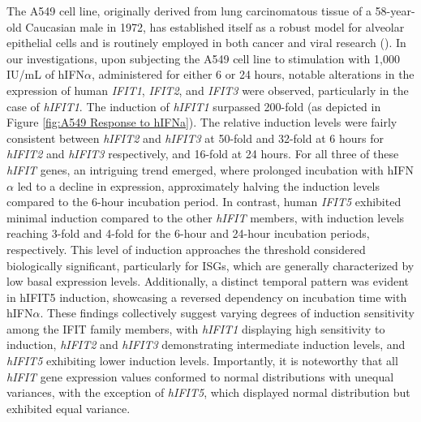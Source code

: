 The A549 cell line, originally derived from lung carcinomatous tissue of a 58-year-old Caucasian male in 1972, has established itself as a robust model for alveolar epithelial cells and is routinely employed in both cancer and viral research (\cite{Lieber1976ACells}). In our investigations, upon subjecting the A549 cell line to stimulation with 1,000 IU/mL of hIFN\(\alpha\), administered for either 6 or 24 hours, notable alterations in the expression of human \textit{IFIT1}, \textit{IFIT2}, and \textit{IFIT3} were observed, particularly in the case of \textit{hIFIT1}. The induction of \textit{hIFIT1} surpassed 200-fold (as depicted in Figure \ref{fig:A549 Response to hIFNa}). The relative induction levels were fairly consistent between \textit{hIFIT2} and \textit{hIFIT3} at 50-fold and 32-fold at 6 hours for \textit{hIFIT2} and \textit{hIFIT3} respectively, and 16-fold at 24 hours. For all three of these \textit{hIFIT} genes, an intriguing trend emerged, where prolonged incubation with hIFN\(\alpha\) led to a decline in expression, approximately halving the induction levels compared to the 6-hour incubation period. In contrast, human \textit{IFIT5} exhibited minimal induction compared to the other \textit{hIFIT} members, with induction levels reaching 3-fold and 4-fold for the 6-hour and 24-hour incubation periods, respectively. This level of induction approaches the threshold considered biologically significant, particularly for ISGs, which are generally characterized by low basal expression levels. Additionally, a distinct temporal pattern was evident in hIFIT5 induction, showcasing a reversed dependency on incubation time with hIFN\(\alpha\). These findings collectively suggest varying degrees of induction sensitivity among the IFIT family members, with \textit{hIFIT1} displaying high sensitivity to induction, \textit{hIFIT2} and \textit{hIFIT3} demonstrating intermediate induction levels, and \textit{hIFIT5} exhibiting lower induction levels. Importantly, it is noteworthy that all \textit{hIFIT} gene expression values conformed to normal distributions with unequal variances, with the exception of \textit{hIFIT5}, which displayed normal distribution but exhibited equal variance. 

